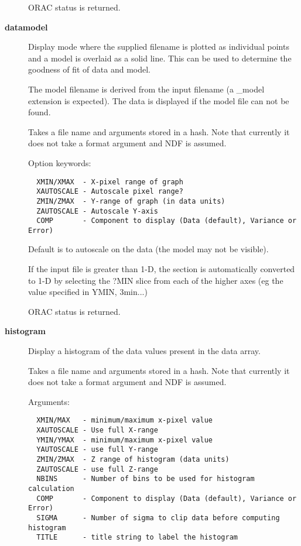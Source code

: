 \begin{description}
ORAC status is returned.


\item[{\textbf{datamodel}}] \mbox{}

Display mode where the supplied filename is plotted as individual
points and a model is overlaid as a solid line. This can be used
to determine the goodness of fit of data and model.



The model filename is derived from the input filename (a \_model
extension is expected). The data is displayed if the model
file can not be found.



Takes a file name and arguments stored in a hash.
Note that currently it does not take a format argument
and NDF is assumed.



Option keywords:

\begin{verbatim}
  XMIN/XMAX  - X-pixel range of graph
  XAUTOSCALE - Autoscale pixel range?
  ZMIN/ZMAX  - Y-range of graph (in data units)
  ZAUTOSCALE - Autoscale Y-axis
  COMP       - Component to display (Data (default), Variance or Error)
\end{verbatim}


Default is to autoscale on the data (the model may not be visible).



If the input file is greater than 1-D, the section is automatically
converted to 1-D by selecting the ?MIN slice from each of the
higher axes (eg the value specified in YMIN, 3min...)



ORAC status is returned.


\item[{\textbf{histogram}}] \mbox{}

Display a histogram of the data values present in the data array.



Takes a file name and arguments stored in a hash. Note that currently
it does not take a format argument and NDF is assumed.



Arguments:

\begin{verbatim}
  XMIN/MAX   - minimum/maximum x-pixel value
  XAUTOSCALE - Use full X-range
  YMIN/YMAX  - minimum/maximum x-pixel value
  YAUTOSCALE - use full Y-range
  ZMIN/ZMAX  - Z range of histogram (data units)
  ZAUTOSCALE - use full Z-range
  NBINS      - Number of bins to be used for histogram calculation
  COMP       - Component to display (Data (default), Variance or Error)
  SIGMA      - Number of sigma to clip data before computing histogram
  TITLE      - title string to label the histogram
\end{verbatim}



\end{description}
